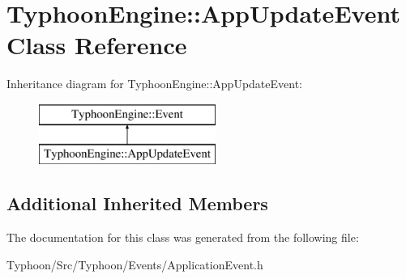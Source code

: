 \hypertarget{class_typhoon_engine_1_1_app_update_event}{}\section{Typhoon\+Engine\+::App\+Update\+Event Class Reference}
\label{class_typhoon_engine_1_1_app_update_event}
Inheritance diagram for Typhoon\+Engine\+::App\+Update\+Event\+:\begin{figure}[H]
\begin{center}
\leavevmode
\includegraphics[height=2.000000cm]{class_typhoon_engine_1_1_app_update_event}
\end{center}
\end{figure}
\subsection*{Additional Inherited Members}


The documentation for this class was generated from the following file\+:\begin{DoxyCompactItemize}
\item 
Typhoon/\+Src/\+Typhoon/\+Events/Application\+Event.\+h\end{DoxyCompactItemize}
